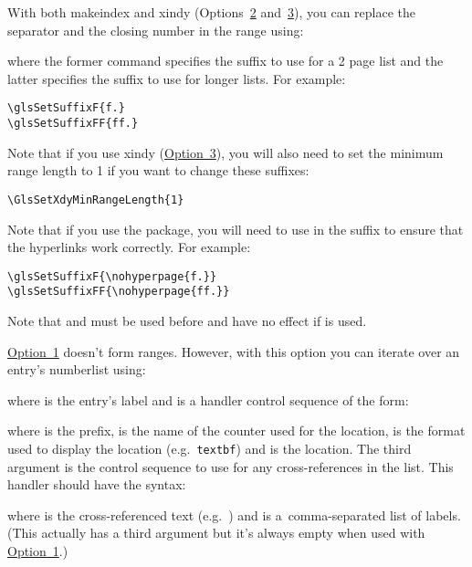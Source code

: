 \documentclass[report,inlinetitle]{nlctdoc}
\newcommand*{\opt}[1]{\hyperlink{option#1}{Option~#1}}
\newcommand*{\optsand}[2]{Options~\hyperlink{option#1}{#1}
and~\hyperlink{option#2}{#2}}
\begin{document}
With both \gls{makeindex} and \gls{xindy} (\optsand23), you can replace
the separator and the closing number in the range using:
\begin{definition}[\DescribeMacro{\glsSetSuffixF}]
\end{definition}
\begin{definition}[\DescribeMacro{\glsSetSuffixFF}]
\end{definition}
where the former command specifies the suffix to use for a 2 page
list and the latter specifies the suffix to use for longer lists.
For example:
\begin{verbatim}
\glsSetSuffixF{f.}
\glsSetSuffixFF{ff.}
\end{verbatim}
Note that if you use \gls{xindy} (\opt3), you will also need to
set the minimum range length to 1 if you want to change these
suffixes:
\begin{verbatim}
\GlsSetXdyMinRangeLength{1}
\end{verbatim}
Note that if you use the  package, you will need
to use  in the suffix to ensure that the hyperlinks
work correctly. For example:
\begin{verbatim}
\glsSetSuffixF{\nohyperpage{f.}}
\glsSetSuffixFF{\nohyperpage{ff.}}
\end{verbatim}

\begin{important}
Note that  and  must be used 
before  and have no effect if  is 
used.
\end{important}

\opt1 doesn't form ranges. However, with this option you
can iterate over an entry's \gls{numberlist} using:
\begin{definition}[\DescribeMacro\glsnumberlistloop]
\end{definition}
where  is the entry's label and  is a
handler control sequence of the form:
\begin{definition}
\end{definition}
where  is the  prefix,  is
the name of the counter used for the location,  is the
format used to display the location (e.g.\ \texttt{textbf})
and  is the location. The third argument is the
control sequence to use for any cross-references in the list. This
handler should have the syntax:
\begin{definition}
\end{definition}
where  is the cross-referenced text (e.g.\ ) and
 is a~comma-separated list of labels. (This actually
has a third argument but it's always empty when used with \opt1.)
\end{document}
